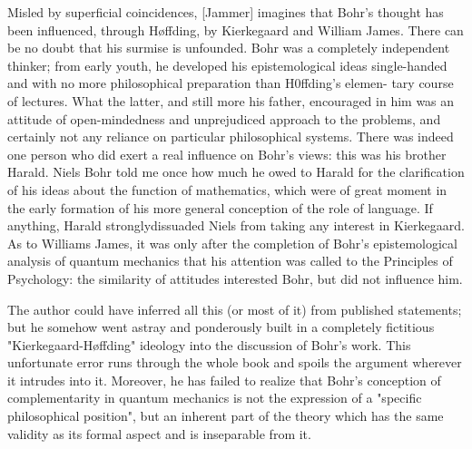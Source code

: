 Misled by superficial coincidences, [Jammer] imagines that Bohr's thought has been influenced, through Høffding, by Kierkegaard and William James. There can be no doubt that his surmise is unfounded. Bohr was a completely independent thinker; from early youth, he developed his epistemological ideas single-handed and with no more philosophical preparation than H0ffding's elemen- tary course of lectures. What the latter, and still more his father, encouraged in him was an attitude of open-mindedness and unprejudiced approach to the problems, and certainly not any reliance on particular philosophical systems. There was indeed one person who did exert a real influence on Bohr's views: this was his brother Harald. Niels Bohr told me once how much he owed to Harald for the clarification of his ideas about the function of mathematics, which were of great moment in the early formation of his more general conception of the role of language. If anything, Harald stronglydissuaded Niels from taking any interest in Kierkegaard. As to Williams James, it was only after the completion of Bohr's epistemological analysis of quantum mechanics that his attention was called to the Principles of Psychology: the similarity of attitudes interested Bohr, but did not influence him.

The author could have inferred all this (or most of it) from published statements; but he somehow went astray and ponderously built in a completely fictitious "Kierkegaard-Høffding" ideology into the discussion of Bohr's work. This unfortunate error runs through the whole book and spoils the argument wherever it intrudes into it. Moreover, he has failed to realize that Bohr's conception of complementarity in quantum mechanics is not the expression of a "specific philosophical position", but an inherent part of the theory which has the same validity as its formal aspect and is inseparable from it.




